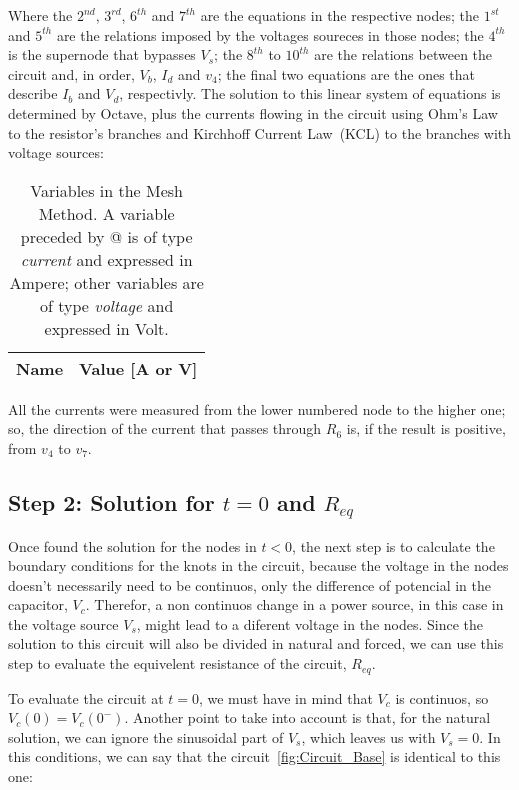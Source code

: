 Where the $2^{nd}$, $3^{rd}$, $6^{th}$ and $7^{th}$ are the equations in the respective nodes; the $1^{st}$ and $5^{th}$ are the relations imposed by the voltages soureces in those nodes; the $4^{th}$ is the supernode that bypasses $V_s$; the $8^{th}$ to $10^{th}$ are the relations between the circuit and, in order, $V_b$, $I_d$ and $v_4$; the final two equations are the ones that describe $I_b$ and $V_d$, respectivly. 
The solution to this linear system of equations is determined by Octave, plus the currents flowing in the circuit using Ohm's Law to the resistor's branches and Kirchhoff Current Law~(KCL) to the branches with voltage sources:

\begin{table}[h]
  \centering
  \begin{tabular}{|l|r|}
    \hline    
    {\bf Name} & {\bf Value [A or V]} \\ \hline
    
  \end{tabular}
  \caption{Variables in the Mesh Method. A variable preceded by @ is of type {\em current} and expressed in Ampere; other variables are of type {\em voltage} and expressed in Volt.}
  \label{tab:PASSO1}
\end{table}

All the currents were measured from the lower numbered node to the higher one; so, the direction of the current that passes through $R_6$ is, if the result is positive, from $v_4$ to $v_7$.

\subsection{Step 2: Solution for $t=0$ and $R_{eq}$}

Once found the solution for the nodes in $t<0$, the next step is to calculate the boundary conditions for the knots in the circuit, because the voltage in the nodes doesn't necessarily need to be continuos, only the difference of potencial in the capacitor, $V_c$. Therefor, a non continuos change in a power source, in this case in the voltage source $V_s$, might lead to a diferent voltage in the nodes.
Since the solution to this circuit will also be divided in natural and forced, we can use this step to evaluate the equivelent resistance of the circuit, $R_{eq}$.

To evaluate the circuit at $t=0$, we must have in mind that $V_c$ is continuos, so $V_c(0)=V_c(0^-)$. Another point to take into account is that, for the natural solution, we can ignore the sinusoidal part of $V_s$, which leaves us with $V_s=0$. In this conditions, we can say that the circuit~\ref{fig:Circuit_Base} is identical to this one:

